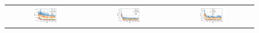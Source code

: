 \documentclass[12pt, a4paper,  nobibnotes]{article}
\begin{document}
\renewcommand{\thisfigurewidth}{0.33}
\begin{figure}[H]
    \centering
    \begin{tabular}{ccc}
      \includegraphics[width=\thisfigurewidth\textwidth]{figures/tanh-test-mse-bs=4-lr=0_001-shotsearch.pdf} & 
      \includegraphics[width=\thisfigurewidth\textwidth]{figures/iv-test-mse-bs=4-lr=0_001-shotsearch.pdf} &
      \includegraphics[width=\thisfigurewidth\textwidth]{figures/x2-test-mse-bs=4-lr=0_001-shotsearch.pdf} \\

\end{tabular}
\end{figure}
\end{document}
